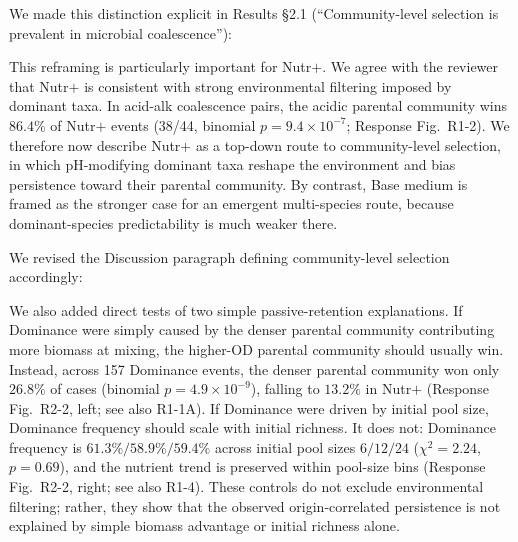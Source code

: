 We made this distinction explicit in Results \S2.1 (``Community-level selection is prevalent in microbial coalescence''): 

This reframing is particularly important for Nutr$+$. We agree with the reviewer that Nutr$+$ is consistent with strong environmental filtering imposed by dominant taxa. In acid-alk coalescence pairs, the acidic parental community wins $86.4\%$ of Nutr$+$ events (38/44, binomial $p = 9.4 \times 10^{-7}$; Response Fig.~R1-2). We therefore now describe Nutr$+$ as a top-down route to community-level selection, in which pH-modifying dominant taxa reshape the environment and bias persistence toward their parental community. By contrast, Base medium is framed as the stronger case for an emergent multi-species route, because dominant-species predictability is much weaker there.

We revised the Discussion paragraph defining community-level selection accordingly: 

We also added direct tests of two simple passive-retention explanations. If Dominance were simply caused by the denser parental community contributing more biomass at mixing, the higher-OD parental community should usually win. Instead, across 157 Dominance events, the denser parental community won only $26.8\%$ of cases (binomial $p = 4.9 \times 10^{-9}$), falling to $13.2\%$ in Nutr$+$ (Response Fig.~R2-2, left; see also R1-1A). If Dominance were driven by initial pool size, Dominance frequency should scale with initial richness. It does not: Dominance frequency is $61.3\% / 58.9\% / 59.4\%$ across initial pool sizes $6 / 12 / 24$ ($\chi^2 = 2.24$, $p = 0.69$), and the nutrient trend is preserved within pool-size bins (Response Fig.~R2-2, right; see also R1-4). These controls do not exclude environmental filtering; rather, they show that the observed origin-correlated persistence is not explained by simple biomass advantage or initial richness alone.

